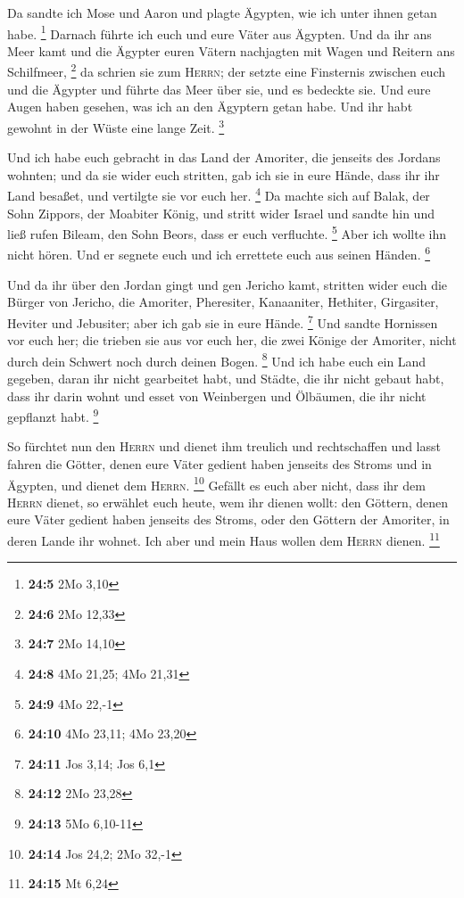  Da sandte ich Mose und Aaron und plagte Ägypten, wie ich
unter ihnen getan habe. \footnote{\textbf{24:5} 2Mo 3,10} 
Darnach führte ich euch und eure Väter aus Ägypten. Und da ihr ans Meer
kamt und die Ägypter euren Vätern nachjagten mit Wagen und Reitern ans
Schilfmeer, \footnote{\textbf{24:6} 2Mo 12,33}  da schrien
sie zum \textsc{Herrn}; der setzte eine Finsternis zwischen euch und die
Ägypter und führte das Meer über sie, und es bedeckte sie. Und eure
Augen haben gesehen, was ich an den Ägyptern getan habe. Und ihr habt
gewohnt in der Wüste eine lange Zeit. \footnote{\textbf{24:7} 2Mo 14,10}

 Und ich habe euch gebracht in das Land der Amoriter, die
jenseits des Jordans wohnten; und da sie wider euch stritten, gab ich
sie in eure Hände, dass ihr ihr Land besaßet, und vertilgte sie vor euch
her. \footnote{\textbf{24:8} 4Mo 21,25; 4Mo 21,31}  Da
machte sich auf Balak, der Sohn Zippors, der Moabiter König, und stritt
wider Israel und sandte hin und ließ rufen Bileam, den Sohn Beors, dass
er euch verfluchte. \footnote{\textbf{24:9} 4Mo 22,-1} 
Aber ich wollte ihn nicht hören. Und er segnete euch und ich errettete
euch aus seinen Händen. \footnote{\textbf{24:10} 4Mo 23,11; 4Mo 23,20}

 Und da ihr über den Jordan gingt und gen Jericho kamt,
stritten wider euch die Bürger von Jericho, die Amoriter, Pheresiter,
Kanaaniter, Hethiter, Girgasiter, Heviter und Jebusiter; aber ich gab
sie in eure Hände. \footnote{\textbf{24:11} Jos 3,14; Jos 6,1}
 Und sandte Hornissen vor euch her; die trieben sie aus
vor euch her, die zwei Könige der Amoriter, nicht durch dein Schwert
noch durch deinen Bogen. \footnote{\textbf{24:12} 2Mo 23,28}
 Und ich habe euch ein Land gegeben, daran ihr nicht
gearbeitet habt, und Städte, die ihr nicht gebaut habt, dass ihr darin
wohnt und esset von Weinbergen und Ölbäumen, die ihr nicht gepflanzt
habt. \footnote{\textbf{24:13} 5Mo 6,10-11}

 So fürchtet nun den \textsc{Herrn} und dienet ihm
treulich und rechtschaffen und lasst fahren die Götter, denen eure Väter
gedient haben jenseits des Stroms und in Ägypten, und dienet dem
\textsc{Herrn}. \footnote{\textbf{24:14} Jos 24,2; 2Mo 32,-1}
 Gefällt es euch aber nicht, dass ihr dem \textsc{Herrn}
dienet, so erwählet euch heute, wem ihr dienen wollt: den Göttern, denen
eure Väter gedient haben jenseits des Stroms, oder den Göttern der
Amoriter, in deren Lande ihr wohnet. Ich aber und mein Haus wollen dem
\textsc{Herrn} dienen. \footnote{\textbf{24:15} Mt 6,24}

